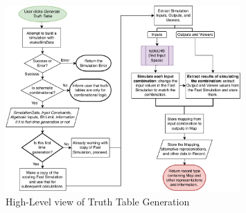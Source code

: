 



\begin{figure}[h]
    \centering
    \includegraphics[width=0.8\textwidth]{04.AnalysisDesign/ttGen.pdf}
    \caption{High-Level view of Truth Table Generation}
    \label{fig:ttGen}
\end{figure}

